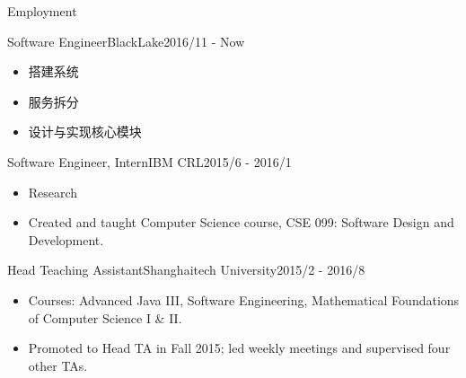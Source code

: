 \documentclass[]{minhuacv}
\begin{document}
	\makeheader
	
	\begin{cvsection}{Employment}
		\begin{cvsubsection}{Software Engineer}{BlackLake}{2016/11 - Now}
			\begin{itemize}
				\item 搭建系统
				\item 服务拆分
				\item 设计与实现核心模块
			\end{itemize}
		\end{cvsubsection}
		
		\begin{cvsubsection}{Software Engineer, Intern}{IBM CRL}{2015/6 - 2016/1}	
			\begin{itemize}
				\item Research
				\item Created and taught Computer Science course, CSE 099: Software Design and Development.
			\end{itemize}
		\end{cvsubsection}
		
		\begin{cvsubsection}{Head Teaching Assistant}{Shanghaitech University}{2015/2 - 2016/8}		
			\begin{itemize}
				\item Courses: Advanced Java III, Software Engineering, Mathematical Foundations of Computer Science I \& II.
				\item Promoted to Head TA in Fall 2015; led weekly meetings and supervised four other TAs.
			\end{itemize}
		\end{cvsubsection}
		
	\end{cvsection}
	
\end{document}
